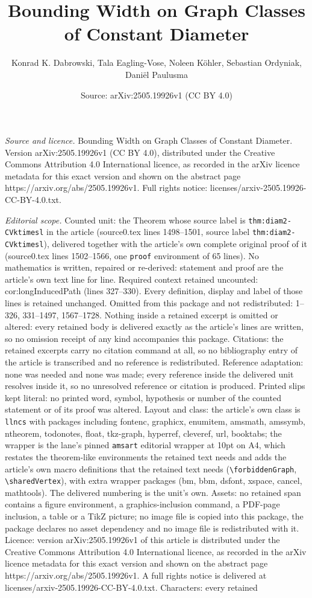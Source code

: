 \documentclass[10pt,a4paper]{amsart}
\title[Bounding Width on Graph Classes of Constant Diameter]{Bounding Width on Graph Classes of Constant Diameter}
\author{Konrad K. Dabrowski, Tala Eagling-Vose, Noleen K\"ohler, Sebastian Ordyniak, Dani\"el Paulusma}
\date{Source: arXiv:2505.19926v1 (CC BY 4.0)}
\begin{document}
\maketitle

\noindent\emph{Source and licence.} Bounding Width on Graph Classes of Constant Diameter. Version arXiv:2505.19926v1 (CC BY 4.0), distributed under the Creative Commons Attribution 4.0 International licence, as recorded in the arXiv licence metadata for this exact version and shown on the abstract page https://arxiv.org/abs/2505.19926v1. Full rights notice: licenses/arxiv-2505.19926-CC-BY-4.0.txt.\par\smallskip

\noindent\textit{Editorial scope.} Counted unit: the Theorem whose source label is \texttt{thm:diam2-CVktimesl} in the article (source0.tex lines 1498--1501, source label \texttt{thm:diam2-CVktimesl}), delivered together with the article's own complete original proof of it (source0.tex lines 1502--1566, one \texttt{proof} environment of 65 lines). No mathematics is written, repaired or re-derived: statement and proof are the article's own text line for line. Required context retained uncounted: cor:longInducedPath (lines 327--330). Every definition, display and label of those lines is retained unchanged. Omitted from this package and not redistributed: 1--326, 331--1497, 1567--1728. Nothing inside a retained excerpt is omitted or altered: every retained body is delivered exactly as the article's lines are written, so no omission receipt of any kind accompanies this package. Citations: the retained excerpts carry no citation command at all, so no bibliography entry of the article is transcribed and no reference is redistributed. Reference adaptation: none was needed and none was made; every reference inside the delivered unit resolves inside it, so no unresolved reference or citation is produced. Printed slips kept literal: no printed word, symbol, hypothesis or number of the counted statement or of its proof was altered. Layout and class: the article's own class is \texttt{llncs} with packages including fontenc, graphicx, enumitem, amsmath, amssymb, ntheorem, todonotes, float, tkz-graph, hyperref, cleveref, url, booktabs; the wrapper is the lane's pinned \texttt{amsart} editorial wrapper at 10pt on A4, which restates the theorem-like environments the retained text needs and adds the article's own macro definitions that the retained text needs (\texttt{\textbackslash forbiddenGraph}, \texttt{\textbackslash sharedVertex}), with extra wrapper packages (bm, bbm, dsfont, xspace, cancel, mathtools). The delivered numbering is the unit's own. Assets: no retained span contains a figure environment, a graphics-inclusion command, a PDF-page inclusion, a table or a TikZ picture; no image file is copied into this package, the package declares no asset dependency and no image file is redistributed with it. Licence: version arXiv:2505.19926v1 of this article is distributed under the Creative Commons Attribution 4.0 International licence, as recorded in the arXiv licence metadata for this exact version and shown on the abstract page https://arxiv.org/abs/2505.19926v1. A full rights notice is delivered at licenses/arxiv-2505.19926-CC-BY-4.0.txt. Characters: every retained 
\end{document}
